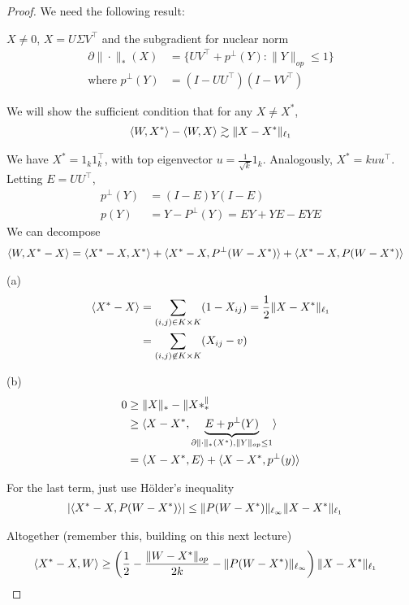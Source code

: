 \begin{proof}
  We need the following result:

  \begin{lemma}
    $X \neq 0$, $X = U \Sigma V^\top$ and the subgradient for nuclear norm
    \begin{align}
      \partial\|\cdot\|_\ast(X)
    &= \{ U V^\top + p^\perp(Y) : \|Y\|_{op} \leq 1
    \} \\
      \text{where } p^\perp(Y) &= (I - U U^\top)(I - V V^\top)
    \end{align}
  \end{lemma}

  We will show the sufficient condition that for any $X \neq X^*$,
  \begin{align}
    \braket{W, X^*} - \braket{W, X} \gtrsim \|X - X^*\|_{\ell_1}
  \end{align}

  We have $X^* = 1_k 1_k^\top$, with top eigenvector
  $u = \frac{1}{\sqrt{k}} 1_k$. Analogously, $X^* = k u u^\top$.
  Letting $E = U U^\top$,
  \begin{align}
    p^\perp(Y) &= (I - E) Y (I - E) \\
    p(Y) &= Y - P^\perp(Y) = E Y + Y E - E Y E
  \end{align}
  We can decompose
  \begin{align}
    \braket{W, X^* - X}
    &= \braket{X^* - X, X^*}
    + \braket{X^* - X, P^\perp(W - X^*)}
    + \braket{X^* - X, P(W - X^*)}
  \end{align}

  (a)
  \begin{align}
    \braket{X^* - X}
    &= \sum_{(i,j) \in K \times K} (1 - X_{ij}) = \frac{1}{2} \|X - X^*\|_{\ell_1} \\
    &= \sum_{(i,j) \not\in K \times K} (X_{ij} - v)
  \end{align}


  (b)
  \begin{align}
    0 &\geq \|X\|_\ast - \|X*^\|_\ast \\
      &\geq \braket{X - X^*, \underbrace{E + p^\perp(Y)}_{\partial\|\cdot\|_\ast(X^*), \|Y\|_{op} \leq 1}} \\
        &= \braket{X - X^*, E} + \braket{X - X^*, p^\perp(y)}
  \end{align}

  For the last term, just use H\"older's inequality
  \begin{align}
    \lvert \braket{X^* - X, P(W - X^*)} \rvert
    &\leq \| P(W - X^*)\|_{\ell_\infty} \|X - X^*\|_{\ell_1}
  \end{align}

  Altogether (remember this, building on this next lecture)
  \begin{align}
    \braket{X^* - X, W}
    &\geq \left(
      \frac{1}{2} - \frac{\|W - X^*\|_{op}}{2k} - \| P(W - X^*) \|_{\ell_\infty}
    \right)
    \|X - X^*\|_{\ell_1}
  \end{align}
\end{proof}
